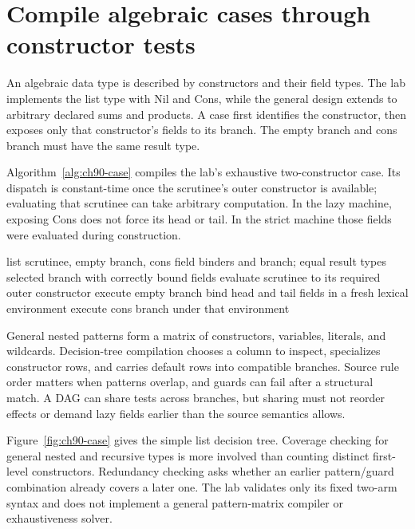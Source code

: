 \section{Compile algebraic cases through constructor tests}
\label{sec:ch90-patterns}
An algebraic data type is described by constructors and their field types.
The lab implements the list type with Nil and Cons, while the general design extends to arbitrary declared sums and products.
A case first identifies the constructor, then exposes only that constructor's fields to its branch.
The empty branch and cons branch must have the same result type.

Algorithm~\ref{alg:ch90-case} compiles the lab's exhaustive two-constructor case.
Its dispatch is constant-time once the scrutinee's outer constructor is available; evaluating that scrutinee can take arbitrary computation.
In the lazy machine, exposing Cons does not force its head or tail.
In the strict machine those fields were evaluated during construction.

\begin{algorithm}[htbp]
\caption{Lower a typed list case without evaluating the unselected branch.}
\label{alg:ch90-case}
\begin{pseudocode}
\Require list scrutinee, empty branch, cons field binders and branch; equal result types
\Ensure selected branch with correctly bound fields
\State evaluate scrutinee to its required outer constructor
 \State execute empty branch
\Else
\State bind head and tail fields in a fresh lexical environment
\State execute cons branch under that environment
\EndIf
\end{pseudocode}
\end{algorithm}

General nested patterns form a matrix of constructors, variables, literals, and wildcards.
Decision-tree compilation chooses a column to inspect, specializes constructor rows, and carries default rows into compatible branches.
Source rule order matters when patterns overlap, and guards can fail after a structural match.
A DAG can share tests across branches, but sharing must not reorder effects or demand lazy fields earlier than the source semantics allows.

Figure~\ref{fig:ch90-case} gives the simple list decision tree.
Coverage checking for general nested and recursive types is more involved than counting distinct first-level constructors.
Redundancy checking asks whether an earlier pattern/guard combination already covers a later one.
The lab validates only its fixed two-arm syntax and does not implement a general pattern-matrix compiler or exhaustiveness solver.

